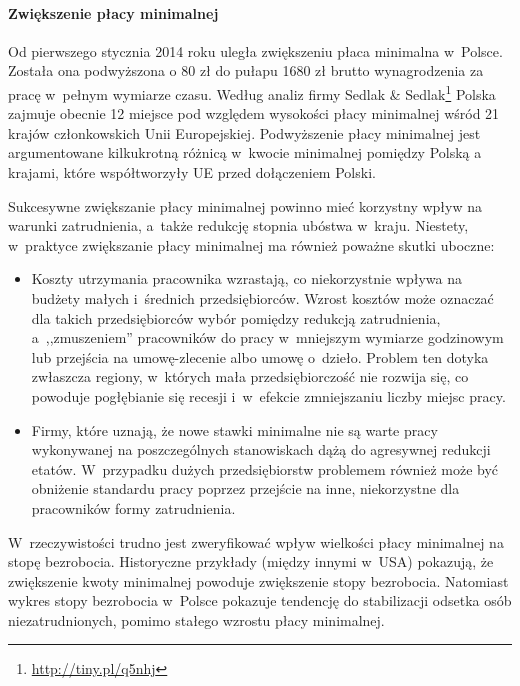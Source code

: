 \documentclass[12pt]{article}
\begin{document}
    \paragraph{Zwiększenie płacy minimalnej} 
    
    Od pierwszego stycznia 2014 roku uległa zwiększeniu płaca minimalna w~Polsce. Została ona podwyższona o 80 zł do pułapu 1680 zł brutto wynagrodzenia za pracę w~pełnym wymiarze czasu. Według analiz firmy Sedlak \& Sedlak\footnote{\url{http://tiny.pl/q5nhj}} Polska zajmuje obecnie 12 miejsce pod względem wysokości płacy minimalnej wśród 21 krajów członkowskich Unii Europejskiej. Podwyższenie płacy minimalnej jest argumentowane kilkukrotną różnicą w~kwocie minimalnej pomiędzy Polską a krajami, które współtworzyły UE przed dołączeniem Polski. 
    
    Sukcesywne zwiększanie płacy minimalnej powinno mieć korzystny wpływ na warunki zatrudnienia, a~także redukcję stopnia ubóstwa w~kraju. Niestety, w~praktyce zwiększanie płacy minimalnej ma również poważne skutki uboczne:
    
    \begin{itemize}
        \item Koszty utrzymania pracownika wzrastają, co niekorzystnie wpływa na budżety małych i~średnich przedsiębiorców. Wzrost kosztów może oznaczać dla takich przedsiębiorców wybór pomiędzy redukcją zatrudnienia, a~,,zmuszeniem'' pracowników do pracy w~mniejszym wymiarze godzinowym lub przejścia na umowę-zlecenie albo umowę o~dzieło. Problem ten dotyka zwłaszcza regiony, w~których mała przedsiębiorczość nie rozwija się, co powoduje pogłębianie się recesji i~w~efekcie zmniejszaniu liczby miejsc pracy.
        \item Firmy, które uznają, że nowe stawki minimalne nie są warte pracy wykonywanej na poszczególnych stanowiskach dążą do agresywnej redukcji etatów. W~przypadku dużych przedsiębiorstw problemem również może być obniżenie standardu pracy poprzez przejście na inne, niekorzystne dla pracowników formy zatrudnienia.
    \end{itemize}

    W~rzeczywistości trudno jest zweryfikować wpływ wielkości płacy minimalnej na stopę bezrobocia. Historyczne przykłady (między innymi w~USA) pokazują, że zwiększenie kwoty minimalnej powoduje zwiększenie stopy bezrobocia. Natomiast wykres stopy bezrobocia w~Polsce pokazuje tendencję do stabilizacji odsetka osób niezatrudnionych, pomimo stałego wzrostu płacy minimalnej.
    
\end{document}
